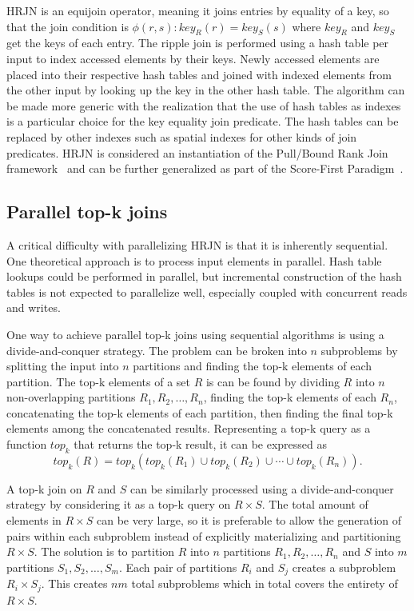 HRJN is an equijoin operator, meaning it joins entries by equality of a key, so that the join condition is \(\phi(r, s) : key_R(r) = key_S(s)\) where \(key_R\) and \(key_S\) get the keys of each entry. The ripple join is performed using a hash table per input to index accessed elements by their keys. Newly accessed elements are placed into their respective hash tables and joined with indexed elements from the other input by looking up the key in the other hash table. The algorithm can be made more generic with the realization that the use of hash tables as indexes is a particular choice for the key equality join predicate. The hash tables can be replaced by other indexes such as spatial indexes for other kinds of join predicates. HRJN is considered an instantiation of the Pull/Bound Rank Join framework~\cite{schnaitter2010optimal} and can be further generalized as part of the Score-First Paradigm~\cite{qi2015efficient}.

\subsection{Parallel top-k joins}

A critical difficulty with parallelizing HRJN is that it is inherently sequential. One theoretical approach is to process input elements in parallel. Hash table lookups could be performed in parallel, but incremental construction of the hash tables is not expected to parallelize well, especially coupled with concurrent reads and writes.

One way to achieve parallel top-k joins using sequential algorithms is using a divide-and-conquer strategy. The problem can be broken into \(n\) subproblems by splitting the input into \(n\) partitions and finding the top-k elements of each partition. The top-k elements of a set \(R\) is can be found by dividing \(R\) into \(n\) non-overlapping partitions \(R_1, R_2, \dotsc, R_n\), finding the top-k elements of each \(R_n\), concatenating the top-k elements of each partition, then finding the final top-k elements among the concatenated results. Representing a top-k query as a function \(top_k\) that returns the top-k result, it can be expressed as
\[
  top_k(R) = top_k(top_k(R_1) \cup top_k(R_2) \cup \cdots \cup top_k(R_n)).
\]

A top-k join on \(R\) and \(S\) can be similarly processed using a divide-and-conquer strategy by considering it as a top-k query on \(R \times S\). The total amount of elements in \(R \times S\) can be very large, so it is preferable to allow the generation of pairs within each subproblem instead of explicitly materializing and partitioning \(R \times S\). The solution is to partition \(R\) into \(n\) partitions \(R_1, R_2, \dotsc, R_n\) and \(S\) into \(m\) partitions \(S_1, S_2, \dotsc, S_m\). Each pair of partitions \(R_i\) and \(S_j\) creates a subproblem \(R_i \times S_j\). This creates \(nm\) total subproblems which in total covers the entirety of \(R \times S\).

